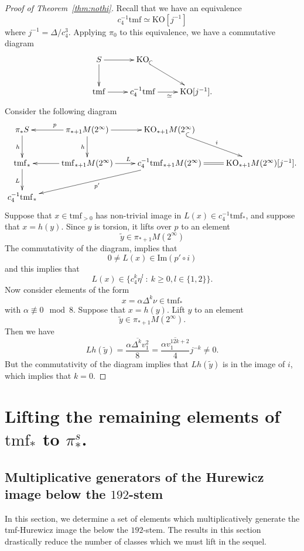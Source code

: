 \documentclass[10pt]{amsart}
\newcommand{\mr}[1]{\mathrm{#1}}
\newcommand{\br}[1]{\overline{#1}}
\newcommand{\td}[1]{\widetilde{#1}}
\newcommand{\tmf}{\mathrm{tmf}}
\newcommand{\KO}{\mr{KO}}
\theoremstyle{definition}
\numberwithin{equation}{section}
\numberwithin{figure}{section}
\begin{document}
\begin{proof}[Proof of Theorem~\ref{thm:nothi}]
Recall that we have an equivalence \cite[Cor.~3]{Laures} 
$$ c_4^{-1}\tmf \simeq \KO[j^{-1}] $$
where $j^{-1} = \Delta/c_4^3$.  Applying $\pi_0$ to this equivalence, we have a commutative diagram
$$
\xymatrix{
S \ar[r] \ar[d] & 
\KO \ar@{^{(}->}[dr] 
\\
\tmf \ar[r] &
c_4^{-1}\tmf \ar[r]_\simeq & 
\KO[j^{-1}].
}
$$
Consider the following diagram
$$
\xymatrix{
\pi_*S \ar[d]_h &
\pi_{*+1} M(2^\infty) \ar[l]_p \ar[d]_h \ar[r] &
\KO_{*+1} M(2^\infty) \ar@{^{(}->}[dr]^i 
\\
\tmf_* \ar[d]_L &
\tmf_{*+1}M(2^\infty) \ar[l] \ar[r]^{L} &
c_4^{-1} \tmf_{*+1}M(2^\infty) \ar[dll]^{p'} \ar@{=}[r] &
\KO_{*+1}M(2^\infty)[j^{-1}].
\\
c_4^{-1}\tmf_*
}
$$
Suppose that $x \in \tmf_{>0}$ has non-trivial image in $L(x) \in c_4^{-1}\tmf_*$, and suppose that $x = h(y)$.  Since $y$ is torsion, it lifts over ${p}$ to an element 
$$ \td{y} \in \pi_{*+1}M(2^\infty) $$
The commutativity of the diagram, implies that
$$ 0 \ne L(x) \in \mr{Im}(p' \circ i) $$
and this implies that
$$ L(x) \in \{c_4^k\eta^l \: : \: k \ge 0, l \in \{1,2\}\}. $$
Now consider elements of the form
$$ x = \alpha\Delta^k\nu \in \tmf_* $$
with $\alpha \not\equiv 0 \mod 8$.  Suppose that $x = h(y)$.  Lift $y$ to an element 
$$ \td{y} \in \pi_{*+1}M(2^\infty). $$
Then we have
$$ Lh(\td{y}) = \frac{\br{\alpha\Delta^k v_1^2}}{8} =  \frac{\br{\alpha v_1^{12k+2}}}{4} j^{-k} \ne 0. $$
But the commutativity of the diagram implies that $Lh(\td{y})$ is in the image of $i$, which implies that $k = 0$. 
\end{proof}

\section{Lifting the remaining elements of $\tmf_*$ to $\pi_*^s$.}\label{sec:tmfhi}

\subsection*{Multiplicative generators of the Hurewicz image below the $192$-stem}

In this section, we determine a set of elements which multiplicatively generate the tmf-Hurewicz image the below the $192$-stem. The results in this section drastically reduce the number of classes which we must lift in the sequel. 
\end{document}
